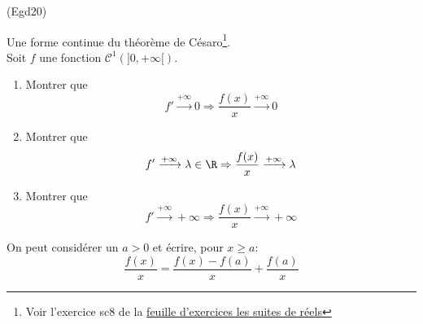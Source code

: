 \begin{tiny}(Egd20)\end{tiny}Une forme continue du théorème de Césaro\footnote{Voir l'exercice sc8 de la \href{http://back.maquisdoc.net/data/temptex/fexsc.pdf}{feuille d'exercices les suites de réels}}.\\
Soit $f$ une fonction $\mathcal C^1(]0,+\infty[)$.
\begin{enumerate}
 \item Montrer que
\begin{displaymath}
 f'\xrightarrow{+\infty} 0 \Rightarrow \frac{f(x)}{x} \xrightarrow{+\infty} 0
\end{displaymath}
 \item Montrer que
\begin{displaymath}
 f'\xrightarrow{+\infty} \lambda\in \R \Rightarrow \frac{f(x)}{x} \xrightarrow{+\infty} \lambda
\end{displaymath}
 \item Montrer que
\begin{displaymath}
 f'\xrightarrow{+\infty} +\infty \Rightarrow \frac{f(x)}{x} \xrightarrow{+\infty} +\infty
\end{displaymath}
\end{enumerate}
On peut considérer un $a>0$ et écrire, pour $x\geq a$:
\begin{displaymath}
 \frac{f(x)}{x}=\frac{f(x)-f(a)}{x} + \frac{f(a)}{x}
\end{displaymath}
